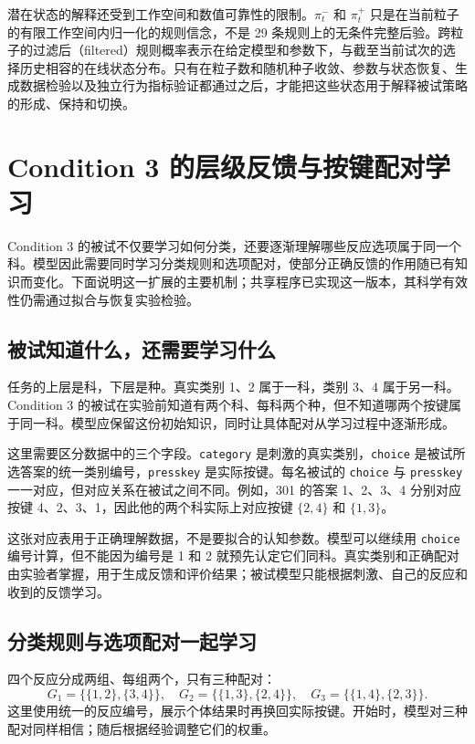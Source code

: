 \documentclass[12pt]{article}
\begin{document}
潜在状态的解释还受到工作空间和数值可靠性的限制。$\pi_t^{-}$ 和 $\pi_t^{+}$ 只是在当前粒子的有限工作空间内归一化的规则信念，不是 29 条规则上的无条件完整后验。跨粒子的过滤后（filtered）规则概率表示在给定模型和参数下，与截至当前试次的选择历史相容的在线状态分布。只有在粒子数和随机种子收敛、参数与状态恢复、生成数据检验以及独立行为指标验证都通过之后，才能把这些状态用于解释被试策略的形成、保持和切换。

\section{Condition 3 的层级反馈与按键配对学习}
\label{sec:condition3-adaptation}

Condition 3 的被试不仅要学习如何分类，还要逐渐理解哪些反应选项属于同一个科。模型因此需要同时学习分类规则和选项配对，使部分正确反馈的作用随已有知识而变化。下面说明这一扩展的主要机制；共享程序已实现这一版本，其科学有效性仍需通过拟合与恢复实验检验。

\subsection{被试知道什么，还需要学习什么}
\label{sec:condition3-coding}

任务的上层是科，下层是种。真实类别 1、2 属于一科，类别 3、4 属于另一科。Condition 3 的被试在实验前知道有两个科、每科两个种，但不知道哪两个按键属于同一科。模型应保留这份初始知识，同时让具体配对从学习过程中逐渐形成。

这里需要区分数据中的三个字段。\texttt{category} 是刺激的真实类别，\texttt{choice} 是被试所选答案的统一类别编号，\texttt{presskey} 是实际按键。每名被试的 \texttt{choice} 与 \texttt{presskey} 一一对应，但对应关系在被试之间不同。例如，301 的答案 1、2、3、4 分别对应按键 4、2、3、1，因此他的两个科实际上对应按键 $\{2,4\}$ 和 $\{1,3\}$。

这张对应表用于正确理解数据，不是要拟合的认知参数。模型可以继续用 \texttt{choice} 编号计算，但不能因为编号是 1 和 2 就预先认定它们同科。真实类别和正确配对由实验者掌握，用于生成反馈和评价结果；被试模型只能根据刺激、自己的反应和收到的反馈学习。

\subsection{分类规则与选项配对一起学习}
\label{sec:condition3-pair-state}

四个反应分成两组、每组两个，只有三种配对：
\begin{equation}
G_1=\{\{1,2\},\{3,4\}\},\quad
G_2=\{\{1,3\},\{2,4\}\},\quad
G_3=\{\{1,4\},\{2,3\}\}.
\label{eq:c3-pairings}
\end{equation}
这里使用统一的反应编号，展示个体结果时再换回实际按键。开始时，模型对三种配对同样相信；随后根据经验调整它们的权重。
\end{document}
